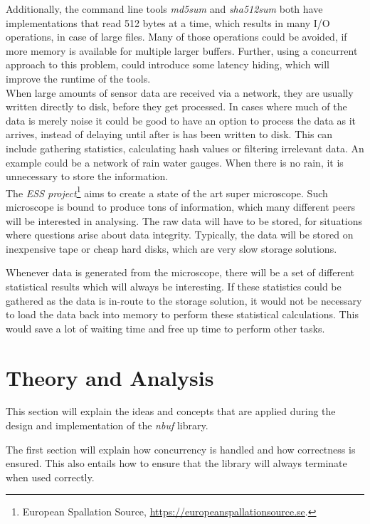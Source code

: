 \documentclass[a4paper]{article}
\newcommand{\nbuf}{\textit{nbuf} }
\begin{document}
Additionally, the command line tools \textit{md5sum} and \textit{sha512sum} both have implementations that read 512 bytes at a time, which results in many I/O operations, in case of large files. Many of those operations could be avoided, if more memory is available for multiple larger buffers. Further, using a concurrent approach to this problem, could introduce some latency hiding, which will improve the runtime of the tools.\\

When large amounts of sensor data are received via a network, they are usually written directly to disk, before they get processed. In cases where much of the data is merely noise it could be good to have an option to process the data as it arrives, instead of delaying until after is has been written to disk. This can include gathering statistics, calculating hash values or filtering irrelevant data. An example could be a network of rain water gauges. When there is no rain, it is unnecessary to store the information.\\

The \textit{ESS project}\footnote{European Spallation Source, \url{https://europeanspallationsource.se}.}  aims to create a state of the art super microscope. Such microscope is bound to produce tons of information, which many different peers will be interested in analysing. The raw data will have to be stored, for situations where questions arise about data integrity. Typically, the data will be stored on inexpensive tape or cheap hard disks, which are very slow storage solutions. 

Whenever data is generated from the microscope, there will be a set of different  statistical results which will always be interesting. If these statistics could be gathered as the data is in-route to the storage solution, it would not be necessary to load the data back into memory to perform these statistical calculations. This would save a lot of waiting time and free up time to perform other tasks.


\newpage
\section{Theory and Analysis}
This section will explain the ideas and concepts that are applied during the design and implementation of the \nbuf library. 

The first section will explain how concurrency is handled and how correctness is ensured. This also entails how to ensure that the library will always terminate when used correctly. 
\end{document}
